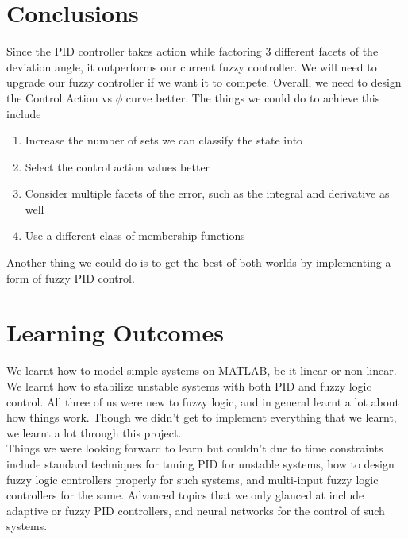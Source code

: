 \section{Conclusions}

Since the PID controller takes action while factoring 3 different facets of the deviation angle, it outperforms our current fuzzy controller. We will need to upgrade our fuzzy controller if we want it to compete. Overall, we need to design the Control Action vs $\phi$ curve better. The things we could do to achieve this include
\begin{enumerate}
	\item Increase the number of sets we can classify the state into
	\item Select the control action values better
	\item Consider multiple facets of the error, such as the integral and derivative as well
	\item Use a different class of membership functions
\end{enumerate}

Another thing we could do is to get the best of both worlds by implementing a form of fuzzy PID control. 

\section{Learning Outcomes}

We learnt how to model simple systems on MATLAB, be it linear or non-linear. We learnt how to stabilize unstable systems with both PID and fuzzy logic control. All three of us were new to fuzzy logic, and in general learnt a lot about how things work. Though we didn't get to implement everything that we learnt, we learnt a lot through this project. \\

Things we were looking forward to learn but couldn't due to time constraints include standard techniques for tuning PID for unstable systems, how to design fuzzy logic controllers properly for such systems, and multi-input fuzzy logic controllers for the same. Advanced topics that we only glanced at include adaptive or fuzzy PID controllers, and neural networks for the control of such systems. 